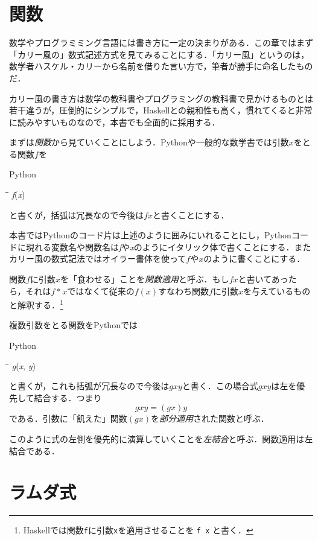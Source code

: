 \documentclass[twocolumn]{jsbook}
\newcommand{\keyword}[1]{{\emph{#1}}}
\newcommand{\code}[1]{\texttt{#1}}
\newenvironment{pythoncode}{\begin{itembox}[r]{Python}}{\end{itembox}}
\newenvironment{python}{\begin{tabbing}\hspace*{1em}\=\hspace*{1em}\=\hspace*{1em}\=\hspace*{1em}\=\kill}{\end{tabbing}}
\newcommand{\pthnId}[1]{\textit{#1}}
\begin{document}
\section{関数}

数学やプログラミミング言語には書き方に一定の決まりがある．この章ではまず「カリー風の」数式記述方式を見てみることにする．「カリー風」というのは，数学者ハスケル・カリーから名前を借りた言い方で，筆者が勝手に命名したものだ．

カリー風の書き方は数学の教科書やプログラミングの教科書で見かけるものとは若干違うが，圧倒的にシンプルで，Haskellとの親和性も高く，慣れてくると非常に読みやすいものなので，本書でも全面的に採用する．

まずは\keyword{関数}から見ていくことにしよう．Pythonや一般的な数学書では引数$x$をとる関数$f$を
\begin{pythoncode}
\begin{python}
\pthnId{f}(\pthnId{x})
\end{python}
\end{pythoncode}
と書くが，括弧は冗長なので今後は$fx$と書くことにする．

本書ではPythonのコード片は上述のように囲みにいれることにし，Pythonコードに現れる変数名や関数名は\pthnId{f}や\pthnId{x}のようにイタリック体で書くことにする．またカリー風の数式記法ではオイラー書体を使って$f$や$x$のように書くことにする．

関数$f$に引数$x$を「食わせる」ことを\keyword{関数適用}と呼ぶ．もし$fx$と書いてあったら，それは$f*x$ではなくて従来の$f(x)$すなわち関数$f$に引数$x$を与えているものと解釈する．\footnote{Haskellでは関数\code{f}に引数\code{x}を適用させることを \code{f x} と書く．}

複数引数をとる関数をPythonでは
\begin{pythoncode}
\begin{python}
\pthnId{g}(\pthnId{x}, \pthnId{y})
\end{python}
\end{pythoncode}
と書くが，これも括弧が冗長なので今後は$gxy$と書く．この場合式$gxy$は左を優先して結合する．つまり$$gxy=(gx)y$$である．引数に「飢えた」関数$(gx)$を\keyword{部分適用}された関数と呼ぶ．

このように式の左側を優先的に演算していくことを\keyword{左結合}と呼ぶ．関数適用は左結合である．

\section{ラムダ式}
\end{document}

